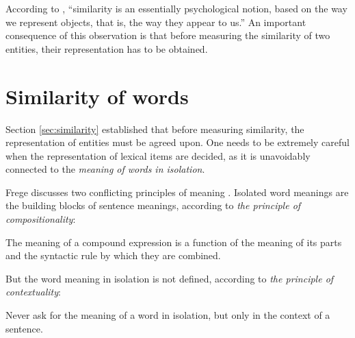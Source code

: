 According to , ``similarity is an essentially psychological notion, based on the way we represent objects, that is, the way they appear to us.'' An important consequence of this observation is that before measuring the similarity of two entities,\footnotemark{} their representation has to be obtained.




\section{Similarity of words}
\label{sec:word-meaning}

Section \ref{sec:similarity} established that before measuring similarity, the representation of entities must be agreed upon. One needs to be extremely careful when the representation of lexical items are decided, as it is unavoidably connected to the \emph{meaning of words in isolation}.


Frege discusses two conflicting principles of meaning \cite{Janssen2001}. Isolated word meanings are the building blocks of sentence meanings, according to \emph{the principle of compositionality}:
\begin{displayquote}
The meaning of a compound expression is a function of the meaning of its parts and the syntactic rule by which they are combined.
\end{displayquote}
But the word meaning in isolation is not defined, according to \emph{the principle of contextuality}:
\begin{displayquote}
Never ask for the meaning of a word in isolation, but only in the context of a sentence.
\end{displayquote}

